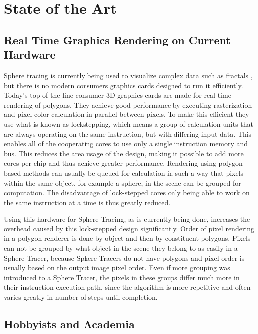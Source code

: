 \chapter{State of the Art}

	\section{ Real Time Graphics Rendering on Current Hardware } 

		Sphere tracing is currently being used to visualize complex data such
		as fractals \cite{TODO}, but there is no modern consumers graphics cards designed to run it
		efficiently.  Today's top of the line consumer 3D graphics cards are
		made for real time rendering of polygons\cite{TODO}. They achieve good performance
		by executing rasterization and pixel color calculation in parallel
		between pixels. To make this efficient they use what is known as
		lockstepping, which means a group of calculation units that are always
		operating on the same instruction, but with differing input data. This
		enables all of the cooperating cores to use only a single instruction
		memory and bus. This reduces the area usage of the design, making it
		possible to add more cores per chip and thus achieve greater
		performance. Rendering using polygon based methods can usually be
		queued for calculation in such a way that pixels within the same
		object, for example a sphere, in the scene can be grouped for computation. The disadvantage of
		lock-stepped cores only being able to work on the same instruction at a
		time is thus greatly reduced.
		
		Using this hardware for Sphere Tracing, as is currently being done,
		increases the overhead caused by this lock-stepped design significantly. 
		Order of pixel rendering in a polygon renderer is done by object and 
		then by constituent polygons. Pixels can not be grouped by what object 
		in the scene they belong to as easily in a Sphere Tracer, because 
		Sphere Tracers do not have polygons and pixel order is usually based on 
		the output image pixel order. Even if more grouping was introduced to a 
		Sphere Tracer, the pixels in these groups differ much more in their 
		instruction execution path, since the algorithm is more repetitive and 
		often varies greatly in number of steps until completion.
		
		\section{ Hobbyists and Academia }

